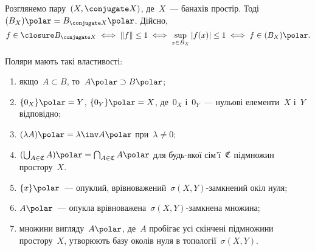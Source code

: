 \begin{example}
    Розглянемо пару~$(X, \conjugate X)$, де~$X$~--- банахів простір. Тоді~$(B_X)\polar = B_{\conjugate X}\polar$. Дійсно,
    \begin{equation*}
        f \in \closure B_{\conjugate X} \iff \|f\| \le 1 \iff \sup_{x \in B_X} |f(x)| \le 1 \iff f \in (B_X)\polar.
    \end{equation*}
\end{example}

\begin{theorem}
    Поляри мають такі властивості:
    \begin{enumerate}
        \item якщо~$A \subset B$, то~$A\polar \supset B\polar$;
        \item $\{0_X\}\polar = Y$, $\{0_Y\}\polar = X$, де~$0_X$ і~$0_Y$~--- нульові елементи~$X$ і~$Y$ відповідно;
        \item $(\lambda A)\polar = \lambda\inv A\polar$ при~$\lambda \ne 0$;
        \item $(\bigcup_{A \in \frak C} A)\polar = \bigcap_{A \in \frak C} A\polar$ для будь-якої сім'ї~$\frak C$ підмножин простору~$X$. %
        \item $\{x\}\polar$~--- опуклий, врівноважений~$\sigma(X, Y)$-замкнений окіл нуля; %
        \item $A\polar$~--- опукла врівноважена~$\sigma(X, Y)$-замкнена множина; %
        \item множини вигляду~$A\polar$, де~$A$ пробігає усі скінчені підмножини простору~$X$, утворюють базу околів нуля в топології~$\sigma(X, Y)$.
    \end{enumerate}
\end{theorem}


